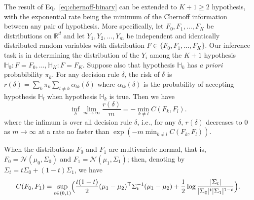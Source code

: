 \documentclass[10pt]{article}
\begin{document}
The result of Eq.~\eqref{eq:chernoff-binary} can be extended to $K + 1 \geq 2$ hypothesis, with the exponential rate being the minimum of the Chernoff information between any pair of hypothesis. More specifically, let $F_0, F_1, \dots, F_{K}$ be distributions on $\mathbb{R}^{d}$ and let $Y_1, Y_2, \dots, Y_m$ be independent and identically distributed random variables with distribution $F \in \{F_0, F_1, \dots, F_K\}$. Our inference task is in determining the distribution of the $Y_i$ among the $K+1$ hypothesis $\mathbb{H}_0 \colon F = F_0, \dots, \mathbb{H}_{K} \colon F = F_K$. Suppose also that hypothesis $\mathbb{H}_k$ has {\em a priori} probabibility $\pi_k$. For any decision rule $\delta$, the risk of $\delta$ is $r(\delta) = \sum_{k} \pi_k \sum_{l \not = k} \alpha_{lk}(\delta) $ where $\alpha_{lk}(\delta)$ is the probability of accepting hypothesis $\mathbb{H}_l$ when hypothesis $\mathbb{H}_k$ is true. Then we have \cite{leang-johnson}
\begin{equation}
\label{eq:chernoff-multiple}
\inf_{\delta} \lim_{m \rightarrow \infty}  \frac{r(\delta)}{m} = - \min_{k \not = l} C(F_k, F_l).
\end{equation}
where the infimum is over all decision rule $\delta$, i.e., for any $\delta$, $r(\delta)$ decreases to $0$ as $m \rightarrow \infty$ at a rate no faster than $\exp(- m \min_{k \not = l} C(F_k, F_l))$.

When the distributions $F_0$ and $F_1$ are multivariate normal, that is, $F_0 =  \mathcal{N}(\mu_0, \Sigma_0)$ and $F_1 = \mathcal{N}(\mu_1, \Sigma_1)$; then, denoting by $\Sigma_t = t \Sigma_0 + (1 - t) \Sigma_1$, we have
\begin{equation*}
C(F_0, F_1) = \sup_{t \in (0,1)} \Bigl(\frac{t(1 - t)}{2} (\mu_1 - \mu_2)^{\top}\Sigma_t^{-1}(\mu_1 - \mu_2) + \frac{1}{2} \log \frac{|\Sigma_t|}{|\Sigma_0|^{t} |\Sigma_1|^{1 - t}}  \Bigr).
\end{equation*}
\end{document}
